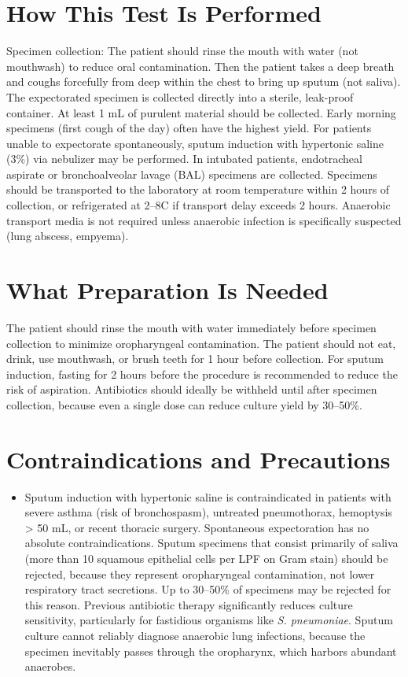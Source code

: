 \section*{How This Test Is Performed}
Specimen collection: The patient should rinse the mouth with water (not mouthwash) to reduce oral contamination. Then the patient takes a deep breath and coughs forcefully from deep within the chest to bring up sputum (not saliva). The expectorated specimen is collected directly into a sterile, leak-proof container. At least 1 mL of purulent material should be collected. Early morning specimens (first cough of the day) often have the highest yield. For patients unable to expectorate spontaneously, sputum induction with hypertonic saline (3\%) via nebulizer may be performed. In intubated patients, endotracheal aspirate or bronchoalveolar lavage (BAL) specimens are collected. Specimens should be transported to the laboratory at room temperature within 2 hours of collection, or refrigerated at 2--8\textdegree{}C if transport delay exceeds 2 hours. Anaerobic transport media is not required unless anaerobic infection is specifically suspected (lung abscess, empyema).

\section*{What Preparation Is Needed}
The patient should rinse the mouth with water immediately before specimen collection to minimize oropharyngeal contamination. The patient should not eat, drink, use mouthwash, or brush teeth for 1 hour before collection. For sputum induction, fasting for 2 hours before the procedure is recommended to reduce the risk of aspiration. Antibiotics should ideally be withheld until after specimen collection, because even a single dose can reduce culture yield by 30--50\%.

\section*{Contraindications and Precautions}
\begin{itemize}
  \item Sputum induction with hypertonic saline is contraindicated in patients with severe asthma (risk of bronchospasm), untreated pneumothorax, hemoptysis > 50 mL, or recent thoracic surgery. Spontaneous expectoration has no absolute contraindications. Sputum specimens that consist primarily of saliva (more than 10 squamous epithelial cells per LPF on Gram stain) should be rejected, because they represent oropharyngeal contamination, not lower respiratory tract secretions. Up to 30--50\% of specimens may be rejected for this reason. Previous antibiotic therapy significantly reduces culture sensitivity, particularly for fastidious organisms like \textit{S. pneumoniae}. Sputum culture cannot reliably diagnose anaerobic lung infections, because the specimen inevitably passes through the oropharynx, which harbors abundant anaerobes.
\end{itemize}
